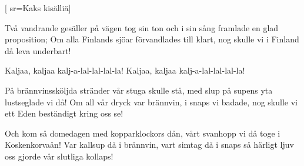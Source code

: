 
[
	sr={Kaks kisälliä}]

\beginverse*
Två vandrande gesäller
på vägen tog sin ton
och i sin sång framlade
en glad proposition;
Om alla Finlands sjöar
förvandlades till klart,
nog skulle vi i Finland
då leva underbart!
\endverse

\beginchorus
Kaljaa, kaljaa
kalj-a-lal-lal-lal-la!
Kaljaa, kaljaa
kalj-a-lal-lal-lal-la!
\endchorus

\beginverse*
På brännvinssköljda stränder
vår stuga skulle stå,
med slup på supens yta
lustseglade vi då!
Om all vår dryck var brännvin,
i snaps vi badade,
nog skulle vi ett Eden
beständigt kring oss se!
\endverse

\beginverse*
Och kom så domedagen
med kopparklockors dån,
vårt svanhopp vi då toge
i Koskenkorvaån!
Var kallsup då i brännvin,
vart simtag då i snaps
så härligt ljuv oss gjorde
vår slutliga kollaps!
\endverse
\endsong